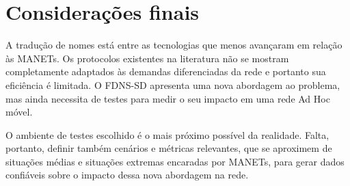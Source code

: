 \section{Considerações finais}
\label{conclusao}

    A tradução de nomes está entre as tecnologias que menos avançaram em relação
    às MANETs. Os protocolos existentes na literatura não se mostram completamente
    adaptados às demandas diferenciadas da rede e portanto sua eficiência é limitada.
    O FDNS-SD apresenta uma nova abordagem ao problema, mas ainda necessita de
    testes para medir o seu impacto em uma rede Ad Hoc móvel.
    
    O ambiente de testes escolhido é o mais próximo possível da realidade. Falta,
    portanto, definir também cenários e métricas relevantes, que se aproximem de
    situações médias e situações extremas encaradas por MANETs, para gerar dados
    confiáveis sobre o impacto dessa nova abordagem na rede.